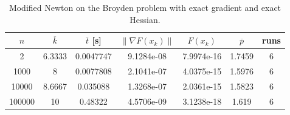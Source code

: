 \begin{table}
\caption{Modified Newton on the Broyden problem with exact gradient and exact Hessian.}
\label{tab:mn_broyden_exact}
\begin{tabular}{ccccccc}
\toprule
$n$ & $\overline{k}$ & $\overline{t}$ [s] & $\|\nabla F(x_k)\|$ & $F(x_k)$ & $\overline{p}$ & runs \\
\midrule
2 & 6.3333 & 0.0047747 & 9.1284e-08 & 7.9974e-16 & 1.7459 & 6 \\
1000 & 8 & 0.0077808 & 2.1041e-07 & 4.0375e-15 & 1.5976 & 6 \\
10000 & 8.6667 & 0.035088 & 1.3268e-07 & 2.0361e-15 & 1.5823 & 6 \\
100000 & 10 & 0.48322 & 4.5706e-09 & 3.1238e-18 & 1.619 & 6 \\
\bottomrule
\end{tabular}
\end{table}
